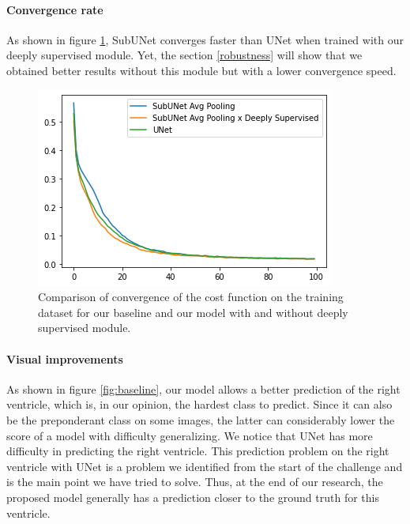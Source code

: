 \documentclass[english]{article}
\begin{document}
\paragraph{Convergence rate}
As shown in figure \ref{fig:convergence}, SubUNet converges faster than UNet when trained with our deeply supervised module. Yet, the section \ref{robustness} will show that we obtained better results without this module but with a lower convergence speed.

\begin{figure}[h]
    \centering
    \includegraphics[scale=0.8]{img/convergence.png}
    \caption{Comparison of convergence of the cost function on the training dataset for our baseline and our model with and without deeply supervised module.}
    \label{fig:convergence}
\end{figure}


\paragraph{Visual improvements}
As shown in figure \ref{fig:baseline}, our model allows a better prediction of the right ventricle, which is, in our opinion, the hardest class to predict. Since it can also be the preponderant class on some images, the latter can considerably lower the score of a model with difficulty generalizing. We notice that UNet has more difficulty in predicting the right ventricle. This prediction problem on the right ventricle with UNet is a problem we identified from the start of the challenge and is the main point we have tried to solve. Thus, at the end of our research, the proposed model generally has a prediction closer to the ground truth for this ventricle.
\end{document}

